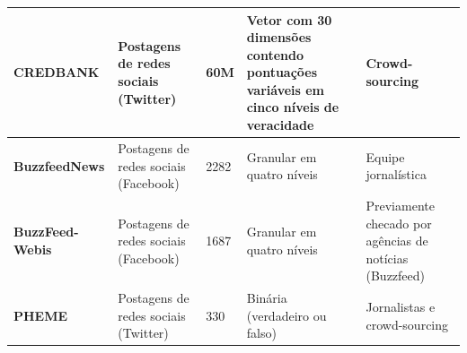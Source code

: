 \documentclass{SBCbookchapter}
\begin{document}
\begin{table} [tb!]
\begin{tabular}{|M{.18\textwidth}|M{.14\textwidth}|M{.07\textwidth}|M{.3\textwidth}|M{.12\textwidth}|}
\hline
\textbf{CREDBANK} \cite{mitra2015credbank}               & Postagens de redes sociais (Twitter)                & 60M             & Vetor com 30 dimensões contendo pontuações variáveis em cinco níveis de veracidade                                                      & Crowd-sourcing                                                         \\ 
\hline
\textbf{BuzzfeedNews}                                                   & Postagens de redes sociais (Facebook)               & 2282            & Granular em quatro níveis                                                                                                               & Equipe jornalística                                                    \\ 
\hline
\textbf{BuzzFeed-Webis} \cite{potthast2017stylometric}   & Postagens de redes sociais (Facebook)               & 1687            & Granular em quatro níveis                                                                                                               & Previamente checado por agências de notícias (Buzzfeed)                \\ 
\hline
\textbf{PHEME} \cite{zubiaga2016analysing}               & Postagens de redes sociais (Twitter)                & 330             & Binária (verdadeiro ou falso)                                                                                                           & Jornalistas e crowd-sourcing                                           \\
\hline
\end{tabular}
\vspace{-8mm}
\end{table}
\end{document}
